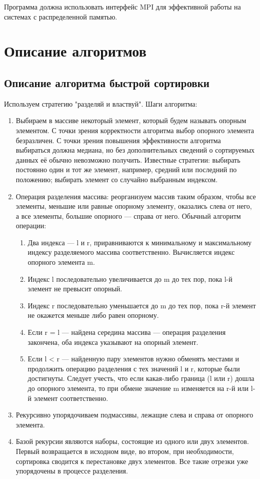 \documentclass[oneside,final,14pt]{extreport}
\begin{document}
Программа должна использовать интерфейс MPI для эффективной работы на системах с распределенной памятью.
\chapter{Описание алгоритмов}
\section{Описание алгоритма быстрой сортировки}
Используем стратегию "разделяй и властвуй". Шаги алгоритма:
\begin{enumerate}
    \item Выбираем в массиве некоторый элемент, который будем называть опорным элементом. С точки зрения корректности алгоритма выбор опорного элемента безразличен. С точки зрения повышения эффективности алгоритма выбираться должна медиана, но без дополнительных сведений о сортируемых данных её обычно невозможно получить. Известные стратегии: выбирать постоянно один и тот же элемент, например, средний или последний по положению; выбирать элемент со случайно выбранным индексом.
    \item Операция разделения массива: реорганизуем массив таким образом, чтобы все элементы, меньшие или равные опорному элементу, оказались слева от него, а все элементы, большие опорного — справа от него. Обычный алгоритм операции:
        \begin{enumerate}
            \item Два индекса — l и r, приравниваются к минимальному и максимальному индексу разделяемого массива соответственно.
            Вычисляется индекс опорного элемента m.
            \item       Индекс l последовательно увеличивается до m до тех пор, пока l-й элемент не превысит опорный.
            \item         Индекс r последовательно уменьшается до m до тех пор, пока r-й элемент не окажется меньше либо равен опорному.
            \item         Если r = l — найдена середина массива — операция разделения закончена, оба индекса указывают на опорный элемент.
            \item         Если l < r — найденную пару элементов нужно обменять местами и продолжить операцию разделения с тех значений l и r, которые были достигнуты. Следует учесть, что если какая-либо граница (l или r) дошла до опорного элемента, то при обмене значение m изменяется на r-й или l-й элемент соответственно. 
        \end{enumerate}
    \item     Рекурсивно упорядочиваем подмассивы, лежащие слева и справа от опорного элемента.
    \item Базой рекурсии являются наборы, состоящие из одного или двух элементов. Первый возвращается в исходном виде, во втором, при необходимости, сортировка сводится к перестановке двух элементов. Все такие отрезки уже упорядочены в процессе разделения.
\end{enumerate}
\end{document}

